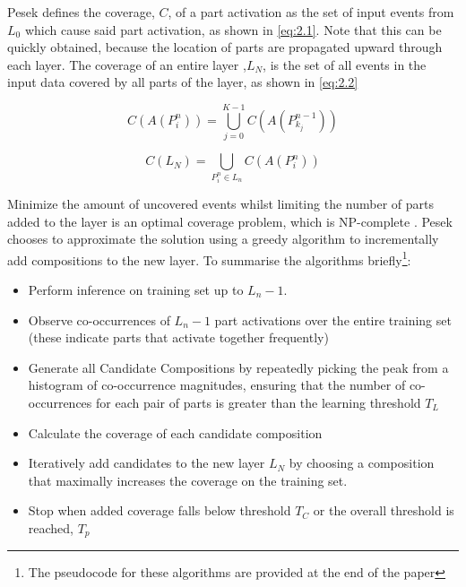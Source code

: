 \documentclass[../main.tex]{subfiles}
\begin{document}
\vspace{0.5cm}
Pesek defines the coverage, $C$, of a part activation as the set of input events from $L_0$ which cause said part activation, as shown in \ref{eq:2.1}. Note that this can be quickly obtained, because the location of parts are propagated upward through each layer. The coverage of an entire layer ,$L_N$, is the set of all events in the input data covered by all parts of the layer, as shown in \ref{eq:2.2}

{\large
\begin{equation} \label{eq:2.1}
C(A(P^n_i)) = \bigcup^{K-1}_{j=0} C(A(P^{n-1}_{k_j}))
\tag{2.1}
\end{equation}

\begin{equation} \label{eq:2.2}
C(L_N) = \bigcup_{P^n_i \in L_n} C(A(P^{n}_{i}))
\tag{2.2}
\end{equation}
}

Minimize the amount of uncovered events whilst limiting the number of parts added to the layer is an optimal coverage problem, which is NP-complete \cite{Pesek:1}. Pesek chooses to approximate the solution using a greedy algorithm to incrementally add compositions to the new layer. To summarise the algorithms briefly\footnote{The pseudocode for these algorithms are provided at the end of the paper}:
\begin{itemize}
    \item Perform inference on training set up to $L_n-1$. 
    \item Observe co-occurrences of $L_n-1$ part activations over the entire training set (these indicate parts that activate together frequently)
    \item Generate all Candidate Compositions by repeatedly picking the peak from a histogram of co-occurrence magnitudes, ensuring that the number of co-occurrences for each pair of parts is greater than the learning threshold $T_L$
    \item Calculate the coverage of each candidate composition
    \item Iteratively add candidates to the new layer $L_N$ by choosing a composition that maximally increases the coverage on the training set.
    \item Stop when added coverage falls below threshold $T_C$ or the overall threshold is reached, $T_p$
\end{itemize} 
\end{document}
